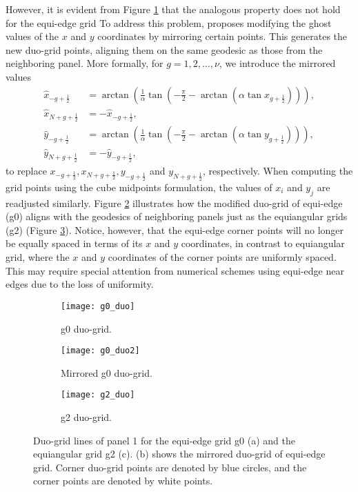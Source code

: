 However, it is evident from Figure \ref{cs-duo-g0} that the analogous property does not hold for the equi-edge grid
To address this problem, \citet{chen:2021} proposes modifying the ghost values of the $x$ and $y$ coordinates by mirroring certain points. 
This generates the new duo-grid points, aligning them on the same geodesic as those from the neighboring panel.
More formally, for $g=1,2,\ldots,\nu$, we introduce the mirrored values
\begin{align}
	\hat{x}_{-g+\frac{1}{2}}  &= \arctan\left(\frac{1}{\alpha}\tan\left(-\frac{\pi}{2}-\arctan{(\alpha \tan{x_{g+\frac{1}{2}} })}\right)\right),\\
	\hat{x}_{N+g+\frac{1}{2}} &= -\hat{x}_{-g+\frac{1}{2}}, \\
	\hat{y}_{-g+\frac{1}{2}}  &= \arctan\left(\frac{1}{\alpha}\tan\left(-\frac{\pi}{2}-\arctan{(\alpha \tan{y_{g+\frac{1}{2}} })}\right)\right),\\
	\hat{y}_{N+g+\frac{1}{2}} &= -\hat{y}_{-g+\frac{1}{2}},
\end{align}
to replace ${x}_{-g+\frac{1}{2}},{x}_{N+g+\frac{1}{2}},{y}_{-g+\frac{1}{2}}$ and ${y}_{N+g+\frac{1}{2}}$, respectively.
When computing the grid points using the cube midpoints formulation, the values of $x_i$ and $y_j$ are readjusted similarly.
Figure \ref{cs-duo-g02} illustrates how the modified duo-grid of equi-edge (g0) aligns with the geodesics of neighboring panels just as the equiangular grids (g2) (Figure \ref{cs-duo-g2}).
Notice, however, that the equi-edge corner points will no longer be equally spaced in terms of its $x$ and $y$ coordinates,
in contrast to equiangular grid, where the $x$ and $y$ coordinates of the corner points are uniformly spaced.
This may require special attention from numerical schemes using equi-edge near edges due to the loss of uniformity.
\begin{figure}[!htb]
	\centering
	\begin{subfigure}{0.45\textwidth}
		\texttt{[image: g0\_duo]}
		\caption{g0 duo-grid.\label{cs-duo-g0}}
	\end{subfigure}
	\begin{subfigure}{0.45\textwidth}
		\centering
		\texttt{[image: g0\_duo2]}
		\caption{Mirrored g0 duo-grid.\label{cs-duo-g02}}
	\end{subfigure}
	\begin{subfigure}{0.45\textwidth}
		\centering
		\texttt{[image: g2\_duo]}
		\caption{g2 duo-grid.\label{cs-duo-g2}}
	\end{subfigure}
	\caption{Duo-grid lines of panel 1 for the equi-edge grid g0 (a) and the equiangular grid g2 (c). (b) shows the mirrored duo-grid of equi-edge grid.
		Corner duo-grid points are denoted by blue circles, and the corner points are denoted by white points.\label{cs-duo}}
\end{figure}

